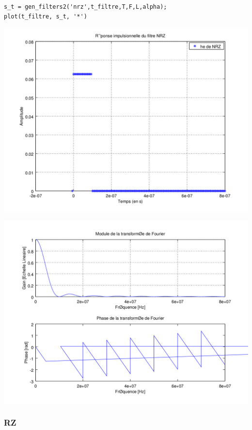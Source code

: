 \documentclass{acm_proc_article-sp}
\begin{document}
\begin{center}
\begin{lstlisting}
s_t = gen_filters2('nrz',t_filtre,T,F,L,alpha);
plot(t_filtre, s_t, '*')
\end{lstlisting}

\includegraphics[scale=0.45]{NRZ_3.png}

\includegraphics[scale=0.45]{NRZ_rep_3.png}
\end{center}

\subsubsection{RZ}
\end{document}
